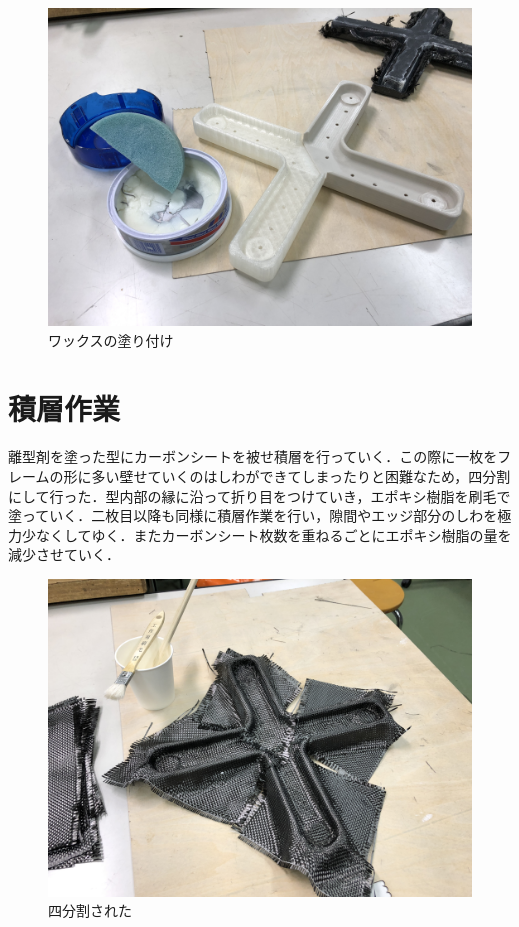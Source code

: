 \begin{figure}[htbp]
  \begin{center}
    \includegraphics[width=120mm]{img/１０.JPG}
    \end{center}
  \caption{ワックスの塗り付け}
 \label{fig:robot}
\end{figure}



\section{積層作業}
離型剤を塗った型にカーボンシートを被せ積層を行っていく．この際に一枚をフレームの形に多い壁せていくのはしわができてしまったりと困難なため，四分割にして行った．型内部の縁に沿って折り目をつけていき，エポキシ樹脂を刷毛で塗っていく．二枚目以降も同様に積層作業を行い，隙間やエッジ部分のしわを極力少なくしてゆく．またカーボンシート枚数を重ねるごとにエポキシ樹脂の量を減少させていく．

\begin{figure}[htbp]
  \begin{center}
    \includegraphics[width=120mm]{img/１１.JPG}
    \end{center}
  \caption{四分割された}
 \label{fig:robot}
\end{figure}

